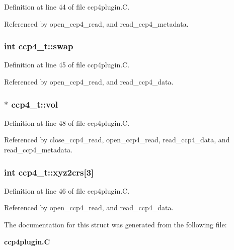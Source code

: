 Definition at line 44 of file ccp4plugin.C.

Referenced by open\_\-ccp4\_\-read, and read\_\-ccp4\_\-metadata.
\subsubsection{\setlength{\rightskip}{0pt plus 5cm}int ccp4\_\-t::swap}\label{structccp4__t_m2}




Definition at line 45 of file ccp4plugin.C.

Referenced by open\_\-ccp4\_\-read, and read\_\-ccp4\_\-data.
\subsubsection{$\ast$ ccp4\_\-t::vol}\label{structccp4__t_m5}




Definition at line 48 of file ccp4plugin.C.

Referenced by close\_\-ccp4\_\-read, open\_\-ccp4\_\-read, read\_\-ccp4\_\-data, and read\_\-ccp4\_\-metadata.
\subsubsection{\setlength{\rightskip}{0pt plus 5cm}int ccp4\_\-t::xyz2crs[3]}\label{structccp4__t_m3}




Definition at line 46 of file ccp4plugin.C.

Referenced by open\_\-ccp4\_\-read, and read\_\-ccp4\_\-data.

The documentation for this struct was generated from the following file:\begin{CompactItemize}
\item 
{\bf ccp4plugin.C}\end{CompactItemize}

